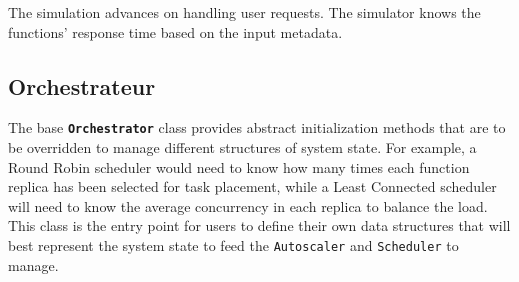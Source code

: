 
The simulation advances on handling user requests. The simulator knows the functions' response time based on the input metadata. %








\subsection{Orchestrateur}

The base \textbf{\texttt{Orchestrator}} class provides abstract initialization methods that are to be overridden to manage different structures of system state. For example, a Round Robin scheduler would need to know how many times each function replica has been selected for task placement, while a Least Connected scheduler will need to know the average concurrency in each replica to balance the load. This class is the entry point for users to define their own data structures that will best represent the system state to feed the \texttt{Autoscaler} and \texttt{Scheduler} to manage.

